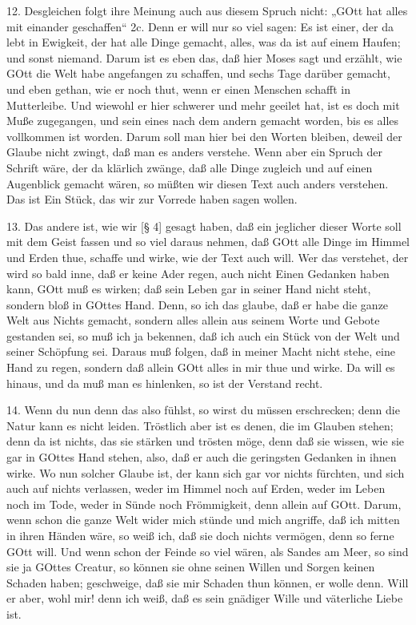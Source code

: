 12. Desgleichen folgt ihre Meinung auch aus diesem Spruch nicht: „GOtt hat alles mit einander geschaffen“ 2c. Denn er will nur so viel sagen: Es ist einer, der da lebt in Ewigkeit, der hat alle Dinge gemacht, alles, was da ist auf einem Haufen; und sonst niemand. Darum ist
es eben das, daß hier Moses sagt und erzählt, wie GOtt die Welt habe angefangen zu schaffen, und sechs Tage darüber gemacht, und eben gethan, wie er noch thut, wenn er einen Menschen schafft in Mutterleibe. Und wiewohl er hier schwerer und mehr geeilet hat, ist es doch mit Muße zugegangen, und sein eines nach dem andern gemacht worden, bis es alles vollkommen ist worden. Darum soll man hier bei den Worten bleiben, deweil der Glaube nicht zwingt, daß man es anders verstehe. Wenn aber ein Spruch der Schrift wäre, der da klärlich zwänge, daß alle Dinge zugleich und auf einen Augenblick gemacht wären, so müßten wir diesen Text auch anders verstehen. Das ist Ein Stück, das wir zur Vorrede haben sagen wollen.

13. Das andere ist, wie wir [§ 4] gesagt haben, daß ein jeglicher dieser Worte soll mit dem Geist fassen und so viel daraus nehmen, daß GOtt alle Dinge im Himmel und Erden thue, schaffe und wirke, wie der Text auch will. Wer das verstehet, der wird so bald inne, daß er keine Ader regen, auch nicht Einen Gedanken haben kann, GOtt muß es wirken; daß sein Leben gar in seiner Hand nicht steht, sondern bloß in GOttes Hand. Denn, so ich das glaube, daß er habe die ganze Welt aus Nichts gemacht, sondern alles allein aus seinem Worte und Gebote gestanden sei, so muß ich ja bekennen, daß ich auch ein Stück von der Welt und seiner Schöpfung sei. Daraus muß folgen, daß in meiner Macht nicht stehe, eine Hand zu regen, sondern daß allein GOtt alles in mir thue und wirke. Da will es hinaus, und da muß man es hinlenken, so ist der Verstand recht.

14. Wenn du nun denn das also fühlst, so wirst du müssen erschrecken; denn die Natur kann es nicht leiden. Tröstlich aber ist es denen, die im Glauben stehen; denn da ist nichts, das sie stärken und trösten möge, denn daß sie wissen, wie sie gar in GOttes Hand stehen, also, daß er auch die geringsten Gedanken in ihnen wirke. Wo nun solcher Glaube ist, der kann sich gar vor nichts fürchten, und sich auch auf nichts verlassen, weder im Himmel noch auf Erden, weder im Leben noch im Tode, weder in Sünde noch Frömmigkeit, denn allein auf GOtt. Darum, wenn schon die ganze Welt wider mich stünde und mich angriffe, daß ich mitten in ihren Händen wäre, so weiß ich, daß sie doch nichts vermögen, denn so ferne GOtt will. Und wenn schon der Feinde so viel wären, als Sandes am Meer, so sind sie ja GOttes Creatur, so können sie ohne seinen Willen und Sorgen keinen Schaden haben; geschweige, daß sie mir Schaden thun können, er wolle denn. Will er aber, wohl mir! denn ich weiß, daß es sein gnädiger Wille und väterliche Liebe ist.

